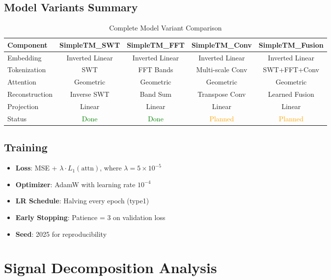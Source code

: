 \documentclass[12pt,a4paper]{article}
\begin{document}
\subsection{Model Variants Summary}

\begin{table}[H]
\centering
\caption{Complete Model Variant Comparison}
\label{tab:variants}
\begin{tabular}{lcccc}
\toprule
\textbf{Component} & \textbf{SimpleTM\_SWT} & \textbf{SimpleTM\_FFT} & \textbf{SimpleTM\_Conv} & \textbf{SimpleTM\_Fusion} \\
\midrule
Embedding & Inverted Linear & Inverted Linear & Inverted Linear & Inverted Linear \\
Tokenization & SWT & FFT Bands & Multi-scale Conv & SWT+FFT+Conv \\
Attention & Geometric & Geometric & Geometric & Geometric \\
Reconstruction & Inverse SWT & Band Sum & Transpose Conv & Learned Fusion \\
Projection & Linear & Linear & Linear & Linear \\
\midrule
Status & \textcolor{green}{Done} & \textcolor{green}{Done} & \textcolor{orange}{Planned} & \textcolor{orange}{Planned} \\
\bottomrule
\end{tabular}
\end{table}

\subsection{Training}

\begin{itemize}[noitemsep]
  \item \textbf{Loss}: MSE + $\lambda \cdot L_1(\text{attn})$, where $\lambda = 5 \times 10^{-5}$
  \item \textbf{Optimizer}: AdamW with learning rate $10^{-4}$
  \item \textbf{LR Schedule}: Halving every epoch (type1)
  \item \textbf{Early Stopping}: Patience = 3 on validation loss
  \item \textbf{Seed}: 2025 for reproducibility
\end{itemize}

\section{Signal Decomposition Analysis}
\end{document}
